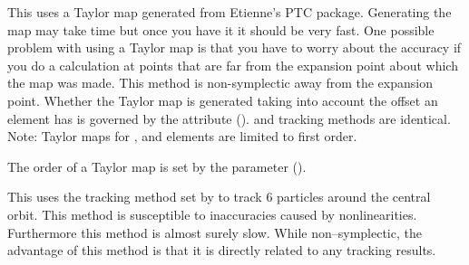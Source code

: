 \begin{description}
\item[\vn{Taylor}]
This uses a Taylor map generated from Etienne's PTC
package. Generating the map may take time but once you have it it
should be very fast. One possible problem with using a Taylor map is
that you have to worry about the accuracy if you do a calculation at
points that are far from the expansion point about which the map was
made. This method is non-symplectic away from the expansion
point. Whether the Taylor map is generated taking into account the
offset an element has is governed by the 
attribute ().  and 
tracking methods are identical. Note: Taylor maps for , and
 elements are limited to first order.

The order of a Taylor map is set by the 
parameter ().

\item[\vn{Tracking}]
This uses the tracking method set by  to track 6
particles around the central orbit. This method is susceptible to inaccuracies
caused by nonlinearities. Furthermore this method
is almost surely slow. While non--symplectic, the advantage of this method
is that it is directly related to any tracking results.

\end{description}

